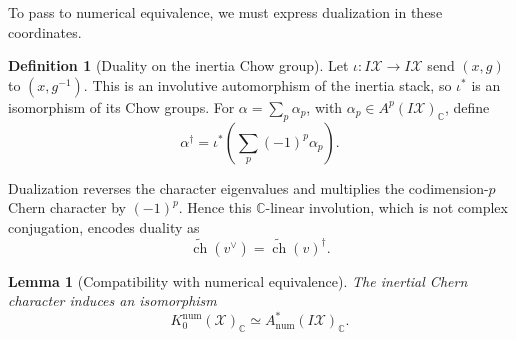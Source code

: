 \documentclass[11pt]{article}
\theoremstyle{plain}
\newtheorem{lemma}[theorem]{Lemma}
\theoremstyle{definition}
\newtheorem{definition}[theorem]{Definition}
\theoremstyle{remark}
\newcommand{\cX}{\mathcal X}
\newcommand{\C}{\mathbb C}
\newcommand{\1}{\mathbf 1}
\begin{document}
To pass to numerical equivalence, we must express dualization in these coordinates.

\begin{definition}[Duality on the inertia Chow group]
Let $\iota:I\cX\to I\cX$ send $(x,g)$ to $(x,g^{-1})$.  This is an involutive automorphism of the inertia stack, so $\iota^*$ is an isomorphism of its Chow groups.  For $\alpha=\sum_p\alpha_p$, with $\alpha_p\in A^p(I\cX)_{\C}$, define
\[
\alpha^\dagger=\iota^*\left(\sum_p(-1)^p\alpha_p\right).
\]
\end{definition}
Dualization reverses the character eigenvalues and multiplies the codimension-$p$ Chern character by $(-1)^p$.  Hence this $\C$-linear involution, which is not complex conjugation, encodes duality as
\[
\widetilde{\operatorname{ch}}(v^\vee)=\widetilde{\operatorname{ch}}(v)^\dagger.
\]

\begin{lemma}[Compatibility with numerical equivalence]\label{lem:app-numerical}
The inertial Chern character induces an isomorphism
\[
K_0^{\mathrm{num}}(\cX)_{\C}\simeq A^*_{\mathrm{num}}(I\cX)_{\C}.
\]
\end{lemma}
\end{document}
